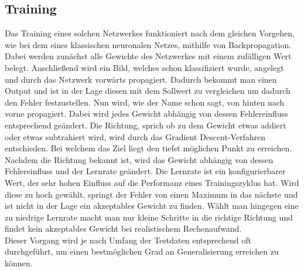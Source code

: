\subsection{Training}
Das Training eines solchen Netzwerkes funktioniert nach dem gleichen Vorgehen, wie bei dem eines klassischen neuronalen Netzes, mithilfe von Backpropagation.\\
Dabei werden zunächst alle Gewichte des Netzwerkes mit einem zufälligen Wert belegt. Anschließend wird ein Bild, welches schon klassifiziert wurde, angelegt und durch das Netzwerk vorwärts propagiert. Dadurch bekommt man einen Output und ist in der Lage diesen mit dem Sollwert zu vergleichen um dadurch den Fehler festzustellen. Nun wird, wie der Name schon sagt, von hinten nach vorne propagiert. Dabei wird jedes Gewicht abhängig von dessen Fehlereinfluss entsprechend geändert. Die Richtung, sprich ob zu dem Gewicht etwas addiert oder etwas subtrahiert wird, wird durch das Gradient Descent-Verfahren entschieden. Bei welchem das Ziel liegt den tiefst möglichen Punkt zu erreichen. Nachdem die Richtung bekannt ist, wird das Gewicht abhängig von dessen Fehlereinfluss und der Lernrate geändert. Die Lernrate ist ein konfigurierbarer Wert, der sehr hohen Einfluss auf die Performanz eines Trainingszyklus hat. Wird diese zu hoch gewählt, springt der Fehler von einen Maximum in das nächste und ist nicht in der Lage ein akzeptables Gewicht zu finden. Wählt man hingegen eine zu niedrige Lernrate macht man nur kleine Schritte in die richtige Richtung und findet kein akzeptables Gewicht bei realistischem Rechenaufwand.\\
Dieser Vorgang wird je nach Umfang der Testdaten entsprechend oft durchgeführt, um einen bestmöglichen Grad an Generalisierung erreichen zu können\cite{Jefkine.2016}.